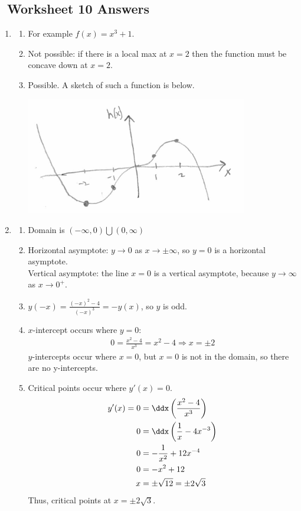 \newpage\subsection*{\Course \ Worksheet 10 Answers}
\begin{enumerate}
    
    \item 
    \begin{enumerate}
        \item For example $f(x) = x^3+1$. 
        \item Not possible: if there is a local max at $x=2$ then the function must be concave down at $x=2$. 
        \item Possible. A sketch of such a function is below. 
        \begin{center}
			\includegraphics[width=0.8\textwidth]{images/ImgWS10Curve.png} 
		\end{center}
    \end{enumerate}
    
    \item 
        \begin{enumerate}
        \item Domain is $(-\infty,0) \bigcup (0,\infty)$
        \item Horizontal asymptote: $y\to0$ as $x\to\pm\infty$, so $y=0$ is a horizontal asymptote. \\
        Vertical asymptote: the line $x=0$ is a vertical asymptote, because $y\to\infty$ as $x\to0^+$.
        \item $y(-x) = \frac{(-x)^2 - 4}{(-x)^3} = -y(x)$, so $y$ is odd. 
        \item $x$-intercept occurs where $y=0$: 
        \begin{align*}
        	0 = \frac{x^2 - 4}{x^3} = x^2 - 4 \Rightarrow x = \pm 2
        \end{align*}
        $y$-intercepts occur where $x=0$, but $x=0$ is not in the domain, so there are no y-intercepts.
        \item Critical points occur where $y'(x) =0$. 
        \begin{align*}
        	y'(x) = 
            0 &= \ddx \left(\frac{x^2 - 4}{x^3} \right) \\ 
            0&= \ddx \left(\frac 1 x - 4x^{-3}\right) \\
            0&= -\frac{1}{x^2} + 12x^{-4} \\
            0&= -x^2 + 12 \\
            x &= \pm \sqrt{12} = \pm 2\sqrt{3}
        \end{align*}
        Thus, critical points at $x = \pm 2\sqrt{3}$. 
        

\end{enumerate}
\end{enumerate}
